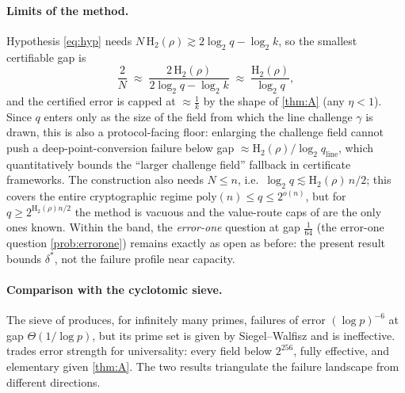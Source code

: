 \documentclass[11pt]{article}
\theoremstyle{definition}
\theoremstyle{remark}
\newcommand{\Hb}{\mathrm{H}_2}
\begin{document}
\paragraph{Limits of the method.}
Hypothesis \eqref{eq:hyp} needs $N\,\Hb(\rho)\gtrsim2\log_2q-\log_2k$, so the smallest certifiable gap is
\[
\frac2N\;\approx\;\frac{2\,\Hb(\rho)}{2\log_2q-\log_2k}\;\approx\;\frac{\Hb(\rho)}{\log_2 q},
\]
and the certified error is capped at $\approx\frac1k$ by the shape of \cref{thm:A} (any $\eta<1$). Since $q$ enters only as the size of the field from which the line challenge $\gamma$ is drawn, this is also a protocol-facing floor: enlarging the challenge field cannot push a deep-point-conversion failure below gap $\approx\Hb(\rho)/\log_2 q_{\mathrm{line}}$, which quantitatively bounds the ``larger challenge field'' fallback in certificate frameworks. The construction also needs $N\le n$, i.e.\ $\log_2q\lesssim\Hb(\rho)\,n/2$; this covers the entire cryptographic regime $\mathrm{poly}(n)\le q\le2^{o(n)}$, but for $q\ge2^{\Hb(\rho)n/2}$ the method is vacuous and the value-route caps of \cite{Cho26a,Cho26b} are the only ones known. Within the band, the \emph{error-one} question at gap $\frac1{64}$ (the error-one question \cref{prob:errorone}) remains exactly as open as before: the present result bounds $\delta^*$, not the failure profile near capacity.

\paragraph{Comparison with the cyclotomic sieve.}
The sieve of \cite{Cho26a} produces, for infinitely many primes, failures of error $(\log p)^{-6}$ at gap $\Theta(1/\log p)$, but its prime set is given by Siegel--Walfisz and is ineffective.  trades error strength for universality: every field below $2^{256}$, fully effective, and elementary given \cref{thm:A}. The two results triangulate the failure landscape from different directions.
\end{document}
